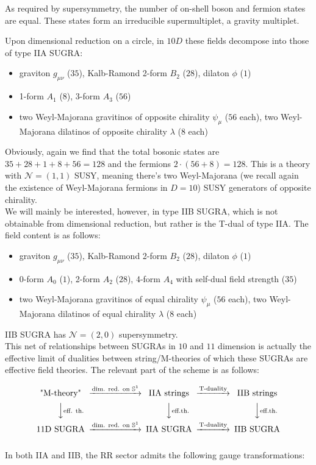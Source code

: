 \documentclass[11pt,a4paper,oneside,openright,titlepage]{book}
\begin{document}
As required by supersymmetry, the number of on-shell boson and fermion states are equal. These states form an irreducible supermultiplet, a gravity multiplet.

Upon dimensional reduction on a circle, in $10D$ these fields decompose into those of type IIA SUGRA:

\begin{itemize}
\item graviton $g_{\mu\nu}$ ($35$), Kalb-Ramond 2-form $B_2$ ($28$), dilaton $\phi$ ($1$)
\item 1-form $A_1$ ($8$), 3-form $A_3$ ($56$)
\item two Weyl-Majorana gravitinos of opposite chirality $\psi_\mu$ ($56$ each), two Weyl-Majorana dilatinos of opposite chirality $\lambda$ ($8$ each)
\end{itemize}

Obviously, again we find that the total bosonic states are $35+28+1+8+56 = 128$ and the fermions $2\cdot (56+8) = 128$. This is a theory with $\mathcal{N}=(1,1)$ SUSY, meaning there's two Weyl-Majorana (we recall again the existence of Weyl-Majorana fermions in $D=10$) SUSY generators of opposite chirality.\\

We will mainly be interested, however, in type IIB SUGRA, which is not obtainable from dimensional reduction, but rather is the T-dual of type IIA. The field content is as follows:

\begin{itemize}
\item graviton $g_{\mu\nu}$ ($35$), Kalb-Ramond 2-form $B_2$ ($28$), dilaton $\phi$ ($1$)
\item 0-form $A_0$ ($1$), 2-form $A_2$ ($28$), 4-form $A_4$ with self-dual field strength ($35$)
\item two Weyl-Majorana gravitinos of equal chirality $\psi_\mu$ ($56$ each), two Weyl-Majorana dilatinos of equal chirality $\lambda$ ($8$ each)
\end{itemize}

IIB SUGRA has $\mathcal{N}=(2,0)$ supersymmetry.\\

This net of relationships between SUGRAs in $10$ and $11$ dimension is actually the effective limit of dualities between string/M-theories of which these SUGRAs are effective field theories. The relevant part of the scheme is as follows:

\[\begin{CD}
\text{"M-theory"}     @> \text{dim. red. on }\mathbb{S}^1>>  \text{IIA strings} @> \text{T-duality} >> \text{IIB strings} \\
@VV\text{eff. th.}V        @VV\text{eff.th.}V  @VV \text{eff.th.} V\\
\text{11D SUGRA}     @> \text{dim. red. on }\mathbb{S}^1>> \text{IIA SUGRA} @> \text{T-duality}>>  \text{IIB SUGRA}
\end{CD}\]
\\
In both IIA and IIB, the RR sector admits the following gauge transformations:
\end{document}
